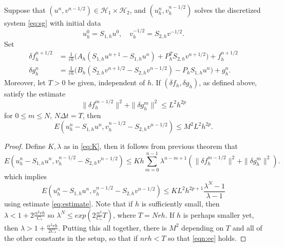 \begin{theorem}
Suppose that $(u^n,v^{n-1/2})\in \mathcal H_1 \times \mathcal H_2$,
and $(u^n_h,v^{n-1/2}_h)$ solves the discretized system \ref{eq:sg} with initial data
\[
	u^0_h = S_{1,h} u^0, \quad v^{-1/2}_h = S_{2,h} v^{-1/2}.
\]
Set
\begin{equation}\label{eqn:tr}
\begin{split}
	\delta f^{n+1/2}_h & = \frac{1}{rh} \Big( A_h( S_{1,h} u^{n+1} - S_{1,h}u^{n}) + 
							   P_h^T S_{2,h} v^{n+1/2} \Big) + f_h^{n+1/2}\\
	\delta g^{n}_h  &= \frac{1}{rh} \Big( B_h (S_{2,h} v^{n+1/2} - S_{2,h} v^{n-1/2}) - 
							P_h S_{1,h}u^n \Big) + g_h^{n}.
\end{split}
\end{equation}
Moreover, let $T>0$ be given, independent of $h$. If $(\delta f_h,\delta g_h)$, as defined above, satisfy the estimate
\begin{equation}\label{eq:estimate}
	\|\delta f_h^{m-1/2}\|^2 + \|\delta g_h^m\|^2 \le L^2 h^{2p}
\end{equation}
	for $0\le m \le N$, $N\Delta t=T$, then 
\begin{equation}
\label{eqn:ee}
	E(u_h^n - S_{1,h}u^n, v_h^{n-1/2} - S_{2,h}v^{n-1/2} ) \le M^2L^2h^{2p}.
\end{equation}
\end{theorem}

\begin{proof}
Define $K, \lambda$ as in \ref{eq:K}, then it follows from previous theorem that
\[
	E(u^n_h - S_{1,h}u^n, v^{n-1/2}_h - S_{2,h} v^{n-1/2}) \le
	Kh\sum_{m=0}^{n-1}\lambda^{n-m+1}(\| \delta f_h^{m-1/2}\|^2 + \|\delta g_h^m\|^2).
\]
which implies
\[
	E(u_h^n - S_{1,h}u^n, v_h^{n-1/2} - S_{2,h}v^{n-1/2} ) \le 
	KL^2 h^{2p+1}\frac{\lambda^N-1}{\lambda-1}
\]
using estimate \ref{eq:estimate}.
Note that if $h$ is sufficiently small, then $\lambda < 1 +
2\frac{\alpha^2rh}{C_*}$ so $\lambda^N \le
exp(2\frac{\alpha^2}{C_*}T)$, where $T=Nrh$. If $h$ is perhaps smaller
yet, then $\lambda > 1+\frac{\alpha^2rh}{2C_*}$. Putting this all
together, there is $M^2$ depending on $T$ and all of the other constants
in the setup, so that if $nrh <T$ so that \ref{eqn:ee} holds.
\end{proof}

